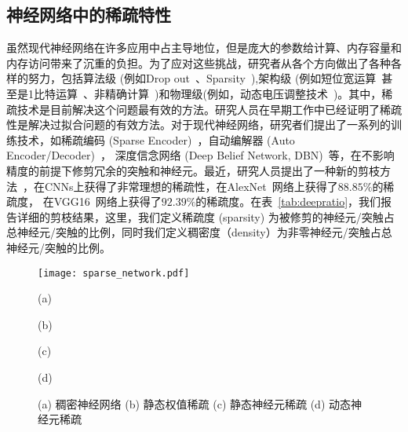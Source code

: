 \subsection{神经网络中的稀疏特性}
虽然现代神经网络在许多应用中占主导地位，但是庞大的参数给计算、内存容量和内存访问带来了沉重的负担。为了应对这些挑战，研究者从各个方向做出了各种各样的努力，包括算法级 (例如Drop out~\cite{srivastava2014dropout}、Sparsity~\cite{han2015learning}),架构级 (例如短位宽运算~\cite{holi1993finite}甚至是1比特运算~\cite{rastegari2016xnor}、非精确计算~\cite{venkataramani2014axnn})和物理级(例如，动态电压调整技术~\cite{pillai2001real})。其中，稀疏技术是目前解决这个问题最有效的方法。研究人员在早期工作中已经证明了稀疏性是解决过拟合问题的有效方法。对于现代神经网络，研究者们提出了一系列的训练技术，如稀疏编码 (Sparse Encoder)~\cite{olshausen1996emergence}，自动编解器 (Auto Encoder/Decoder)~\cite{boureau2008sparse,lee2008sparse}， 深度信念网络 (Deep Belief Network, DBN)~\cite{lee2007efficient}等，在不影响精度的前提下修剪冗余的突触和神经元。最近，研究人员提出了一种新的剪枝方法~\cite{han2015learning}，在CNNs上获得了非常理想的稀疏性，在AlexNet~\cite{krizhevsky2012imagenet}网络上获得了$88.85\%$的稀疏度， 在VGG16~\cite{simonyan2014very}网络上获得了$92.39\%$的稀疏度。在表~\ref{tab:deepratio}，我们报告详细的剪枝结果，这里，我们定义稀疏度 (sparsity) 为被修剪的神经元/突触占总神经元/突触的比例，同时我们定义稠密度（density）为非零神经元/突触占总神经元/突触的比例。


\begin{figure}[h]
  \centering
  \begin{minipage}[t]{\columnwidth}
  \texttt{[image: sparse\_network.pdf]}
  \end{minipage}
  \vfill
  \begin{minipage}[t]{0.24\columnwidth}
      \centering\footnotesize
    (a)
  \end{minipage}
  \hfill
  \begin{minipage}[t]{0.24\columnwidth}
      \centering\footnotesize
    (b)
  \end{minipage}
  \hfill
  \begin{minipage}[t]{0.24\columnwidth}
      \centering\footnotesize
    (c)
  \end{minipage}
    \hfill
  \begin{minipage}[t]{0.24\columnwidth}
      \centering\footnotesize
    (d)
  \end{minipage}
  \caption{ (a) 稠密神经网络 (b) 静态权值稀疏 (c) 静态神经元稀疏 (d) 动态神经元稀疏}
  \label{fig:sparsity}
\end{figure}

